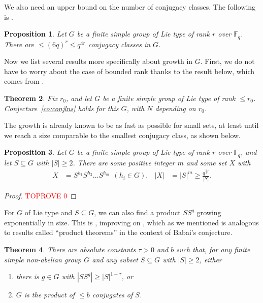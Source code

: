 \documentclass[a4paper]{article}
\newtheorem{proposition}{Proposition}[section]
\newtheorem{theorem}[proposition]{Theorem}
\theoremstyle{definition}
\numberwithin{equation}{section}
\begin{document}
We also need an upper bound on the number of conjugacy classes. The following is \cite[Thm.~1]{LP97}.

\begin{proposition}\label{pr:fewclass}
Let $G$ be a finite simple group of Lie type of rank $r$ over $\mathbb{F}_{q}$. There are $\leq(6q)^{r}\leq q^{4r}$ conjugacy classes in $G$.
\end{proposition}

Now we list several results more specifically about growth in $G$. First, we do not have to worry about the case of bounded rank thanks to the result below, which comes from \cite[Thm.~1.3]{GPSS13}.

\begin{theorem}\label{th:boundr}
Fix $r_{0}$, and let $G$ be a finite simple group of Lie type of rank $\leq r_{0}$. Conjecture~\ref{co:conjlns} holds for this $G$, with $N$ depending on $r_{0}$.
\end{theorem}

The growth is already known to be as fast as possible for small sets, at least until we reach a size comparable to the smallest conjugacy class, as shown below.

\begin{proposition}\label{pr:smallgrow}
Let $G$ be a finite simple group of Lie type of rank $r$ over $\mathbb{F}_{q}$, and let $S\subseteq G$ with $|S|\geq 2$. There are some positive integer $m$ and some set $X$ with
\begin{align*}
X & =S^{h_{1}}S^{h_{2}}\ldots S^{h_{m}} \ \ (h_{i}\in G), & |X| & =|S|^{m}\geq\frac{q^{\frac{1}{2}r}}{|S|}.
\end{align*}
\end{proposition}

\begin{proof}\textcolor{red}{TOPROVE 0}\end{proof}

For $G$ of Lie type and $S\subseteq G$, we can also find a product $SS^{g}$ growing exponentially in size. This is \cite[Thm.~1.6]{GLPS24}, improving on \cite[Thm.~1.4]{GPSS13}, which as we mentioned is analogous to results called ``product theorems'' in the context of Babai's conjecture.

\begin{theorem}\label{th:ptc}
There are absolute constants $\tau>0$ and $b$ such that, for any finite simple non-abelian group $G$ and any subset $S\subseteq G$ with $|S|\geq 2$, either
\begin{enumerate}[(1)]
\item there is $g\in G$ with $|SS^{g}|\geq|S|^{1+\tau}$, or
\item $G$ is the product of $\leq b$ conjugates of $S$.
\end{enumerate}
\end{theorem}
\end{document}
